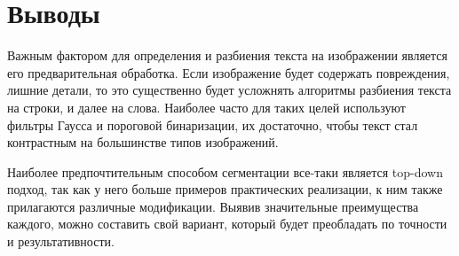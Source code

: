 \section{Выводы} \label{ch2:conclusion}

Важным фактором для определения и разбиения текста на изображении является его предварительная обработка. Если изображение будет содержать повреждения, лишние детали, то это существенно будет усложнять алгоритмы разбиения текста на строки, и далее на слова. Наиболее часто для таких целей используют фильтры Гаусса и пороговой бинаризации, их достаточно, чтобы текст стал контрастным на большинстве типов изображений.

Наиболее предпочтительным способом сегментации все-таки является top-down подход, так как у него больше примеров практических реализации, к ним также прилагаются различные модификации. Выявив значительные преимущества каждого, можно составить свой вариант, который будет преобладать по точности и результативности.

%
